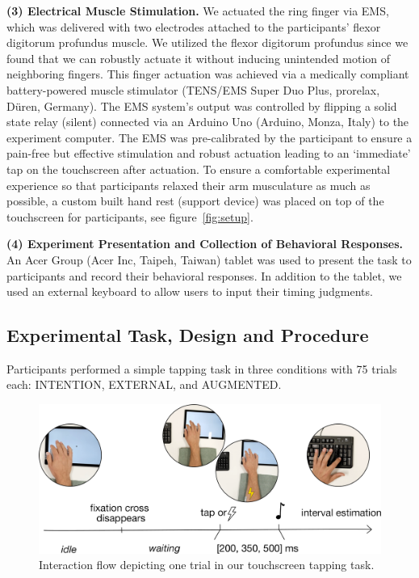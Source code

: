 \indent\textbf{(3) Electrical Muscle Stimulation.} We actuated the ring finger via EMS, which was delivered with two electrodes attached to the participants' flexor digitorum profundus muscle. We utilized the flexor digitorum profundus since we found that we can robustly actuate it without inducing unintended motion of neighboring fingers. This finger actuation was achieved via a medically compliant battery-powered muscle stimulator (TENS/EMS Super Duo Plus, prorelax, Düren, Germany). The EMS system's output was controlled by flipping a solid state relay (silent) connected via an Arduino Uno (Arduino, Monza, Italy) to the experiment computer. The EMS was pre-calibrated by the participant to ensure a pain-free but effective stimulation and robust actuation leading to an `immediate' tap on the touchscreen after actuation. To ensure a comfortable experimental experience so that participants relaxed their arm musculature as much as possible, a custom built hand rest (support device) was placed on top of the touchscreen for participants, see figure~\ref{fig:setup}.

\indent\textbf{(4) Experiment Presentation and Collection of Behavioral Responses.} An Acer Group (Acer Inc, Taipeh, Taiwan) tablet was used to present the task to participants and record their behavioral responses. In addition to the tablet, we used an external keyboard to allow users to input their timing judgments.

\subsection{Experimental Task, Design and Procedure}
Participants performed a simple tapping task in three conditions with 75 trials each: INTENTION, EXTERNAL, and AUGMENTED.

\begin{figure}
    \centering
    \includegraphics[width=\columnwidth]{figures/task_new.pdf}
    \caption{Interaction flow depicting one trial in our touchscreen tapping task.}
    \label{fig:progression}
\end{figure}

